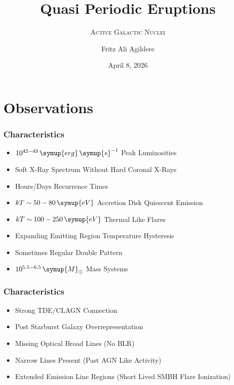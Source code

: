 


\author[F. A. Agildere]{Fritz Ali Agildere}

\date[Apr. 8, 2026]{April 8, 2026}

\title{Quasi Periodic Eruptions}
\subtitle{\textsc{Active Galactic Nuclei}}

\institute[UBG]{}


	\begin{frame}[noframenumbering]
		\titlepage
	\end{frame}

	\section{Observations}

	\begin{frame}
		\frametitle{Characteristics}
		\begin{itemize}
			\item<2-> $10^{42-43} \,\symup{erg}\,\symup{s}^{-1}$ Peak Luminosities
			\item<3-> Soft X-Ray Spectrum Without Hard Coronal X-Rays
			\item<4-> Hours/Days Recurrence Times
			\item<5-> $kT \sim 50 - 80 \,\symup{eV}$ Accretion Disk Quiescent Emission
			\item<6-> $kT \sim 100 - 250 \,\symup{eV}$ Thermal Like Flares
			\item<7-> Expanding Emitting Region Temperature Hysteresis
			\item<8-> Sometimes Regular Double Pattern
			\item<9-> $10^{5.5-6.5} \,\symup{M}_\odot$ Mass Systems
		\end{itemize}
	\end{frame}

	\begin{frame}[noframenumbering]
		\frametitle{Characteristics}
		\begin{itemize}
			\item<2-> Strong TDE/CLAGN Connection
			\item<3-> Post Starburst Galaxy Overrepresentation
			\item<4-> Missing Optical Broad Lines (No BLR)
			\item<5-> Narrow Lines Present (Past AGN Like Activity)
			\item<6-> Extended Emission Line Regions (Short Lived SMBH Flare Ionization)
		\end{itemize}
	\end{frame}

